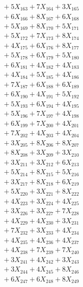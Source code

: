 \documentclass[a4paper,10pt]{article}
\begin{document}
{\begin{align}
&\;  + 5 X_{163} + 7 X_{164} + 3 X_{165} \\[0.3ex]
&\;  + 6 X_{166} + 8 X_{167} + 6 X_{168} \\[0.3ex]
&\;  + 5 X_{169} + 8 X_{170} + 5 X_{171} \\[0.3ex]
&\;  + 5 X_{172} + 7 X_{173} + 8 X_{174} \\[0.3ex]
&\;  + 4 X_{175} + 6 X_{176} + 8 X_{177} \\[0.3ex]
&\;  + 5 X_{178} + 6 X_{179} + 5 X_{180} \\[0.3ex]
&\;  + 6 X_{181} + 4 X_{182} + 4 X_{183} \\[0.3ex]
&\;  + 4 X_{184} + 5 X_{185} + 4 X_{186} \\[0.3ex]
&\;  + 7 X_{187} + 6 X_{188} + 6 X_{189} \\[0.5ex]\allowbreak
&\;  + 6 X_{190} + 4 X_{191} + 5 X_{192} \\[0.3ex]
&\;  + 5 X_{193} + 6 X_{194} + 4 X_{195} \\[0.3ex]
&\;  + 5 X_{196} + 7 X_{197} + 4 X_{198} \\[0.3ex]
&\;  + 6 X_{199} + 7 X_{200} + 4 X_{201} \\[0.3ex]
&\;  + 7 X_{202} + 4 X_{203} + 4 X_{204} \\[0.3ex]
&\;  + 3 X_{205} + 8 X_{206} + 8 X_{207} \\[0.3ex]
&\;  + 8 X_{208} + 3 X_{209} + 3 X_{210} \\[0.3ex]
&\;  + 3 X_{211} + 3 X_{212} + 6 X_{213} \\[0.3ex]
&\;  + 5 X_{214} + 8 X_{215} + 5 X_{216} \\[0.3ex]
&\;  + 3 X_{217} + 8 X_{218} + 6 X_{219} \\[0.5ex]\allowbreak
&\;  + 5 X_{220} + 3 X_{221} + 8 X_{222} \\[0.3ex]
&\;  + 4 X_{223} + 3 X_{224} + 4 X_{225} \\[0.3ex]
&\;  + 3 X_{226} + 3 X_{227} + 7 X_{228} \\[0.3ex]
&\;  + 4 X_{229} + 4 X_{230} + 3 X_{231} \\[0.3ex]
&\;  + 7 X_{232} + 3 X_{233} + 4 X_{234} \\[0.3ex]
&\;  + 4 X_{235} + 4 X_{236} + 4 X_{237} \\[0.3ex]
&\;  + 4 X_{238} + 7 X_{239} + 7 X_{240} \\[0.3ex]
&\;  + 3 X_{241} + 4 X_{242} + 3 X_{243} \\[0.3ex]
&\;  + 3 X_{244} + 4 X_{245} + 8 X_{246} \\[0.3ex]
&\;  + 6 X_{247} + 6 X_{248} + 8 X_{249} \\[0.5ex]\allowbreak

\end{align}}
\end{document}
